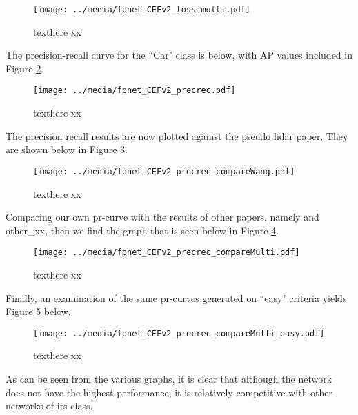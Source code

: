\begin{figure}[h]
    \centering
    \texttt{[image: ../media/fpnet\_CEFv2\_loss\_multi.pdf]}
    \caption{texthere xx}
    \label{fpnet_CEFv2_loss_multi} 
\end{figure}


The precision-recall curve for the ``Car" class is below, with AP values included in Figure \ref{fpnet_CEFv2_precrec}.

\begin{figure}[h]
    \centering
    \texttt{[image: ../media/fpnet\_CEFv2\_precrec.pdf]}
    \caption{texthere xx}
    \label{fpnet_CEFv2_precrec}
\end{figure}

The precision recall results are now plotted against the pseudo lidar paper. They are shown below in Figure \ref{fpnet_CEFv2_precrec_compareWang}.

\begin{figure}[h]
    \centering
    \texttt{[image: ../media/fpnet\_CEFv2\_precrec\_compareWang.pdf]}
    \caption{texthere xx}
    \label{fpnet_CEFv2_precrec_compareWang}
\end{figure}


Comparing our own pr-curve with the results of other papers, namely \cite{wang_pseudo-lidar_2019} and other\_xx, then we find the graph that is seen below in Figure \ref{fpnet_CEFv2_precrec_compareMulti}.



\begin{figure}[h]
    \centering
    \texttt{[image: ../media/fpnet\_CEFv2\_precrec\_compareMulti.pdf]}
    \caption{texthere xx}
    \label{fpnet_CEFv2_precrec_compareMulti}
\end{figure}

Finally, an examination of the same pr-curves generated on ``easy" criteria yields Figure \ref{fpnet_CEFv2_precrec_compareMulti_easy} below.

\begin{figure}[h]
    \centering
    \texttt{[image: ../media/fpnet\_CEFv2\_precrec\_compareMulti\_easy.pdf]}
    \caption{texthere xx}
    \label{fpnet_CEFv2_precrec_compareMulti_easy}
\end{figure}


As can be seen from the various graphs, it is clear that although the network does not have the highest performance, it is relatively competitive with other networks of its class. 


